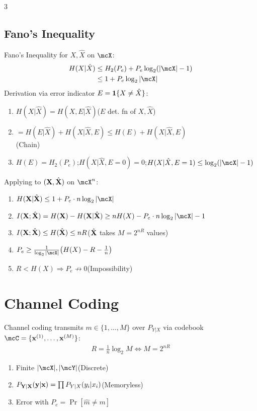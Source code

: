\documentclass[12pt, a4paper]{article}
\begin{document}
\begin{multicols*}{3}
\colbreak
\subsection{Fano's Inequality}
Fano's Inequality for $X,\hat X$ on $\mcX$:
\begin{align*}
  H(X|\hat X)&\le H_2(P_e)+P_e\log_2(|\mcX|-1)\\
             &\le 1+P_e\log_2|\mcX|
\end{align*}
Derivation via error indicator $E=\mathbf{1}{\{X\neq\hat X\}}$:
\begin{enumerate}[\roman*.]
  \item $H(X|\hat X)=H(X,E|\hat X)$\hfill($E$ det. fn of $X,\hat X$)
  \item $=H(E|\hat X)+H(X|\hat X,E)\le H(E)+H(X|\hat X,E)$\\\hfill(Chain)
  \item $H(E)=H_2(P_e)$;\;$H(X|\hat X,E=0)=0$;\;$H(X|\hat X,E=1)\le\log_2(|\mcX|-1)$
\end{enumerate}
 
Applying to $(\mathbf{X},\hat{\mathbf{X}})$ on $\mcX^n$:
\begin{enumerate}[\roman*.]
  \item $H(\bX|\hat\bX)\le 1+P_e\cdot n\log_2|\mcX|$
  \item $I(\bX;\hat\bX)=H(\bX)-H(\bX|\hat\bX)\ge nH(X)-P_e\cdot n\log_2|\mcX|-1$
  \item $I(\mathbf{X};\hat{\mathbf{X}})\le H(\hat{\mathbf{X}})\le nR$\hfill($\hat{\mathbf{X}}$ takes $M=2^{nR}$ values)
  \item $P_e\ge\tfrac{1}{\log_2|\mcX|}\big(H(X)-R-\tfrac{1}{n}\big)$
  \item $R<H(X)\Rightarrow P_e\not\to 0$\hfill(Impossibility)
\end{enumerate}
\colbreak 
\colbreak
\section{Channel Coding}
Channel coding transmits $m\in\{1,\dots,M\}$ over $P_{Y|X}$ via codebook $\mcC=\{\bx^{(1)},\dots,\bx^{(M)}\}$:
\begin{align*}
  R=\tfrac{1}{n}\log_2 M \iff M = 2^{nR}
\end{align*}
\begin{enumerate}[\roman*.]
  \item Finite $|\mcX|,|\mcY|$\hfill(Discrete)
  \item $P_{\mathbf{Y}|\mathbf{X}}(\mathbf{y}|\mathbf{x})=\prod P_{Y|X}(y_i|x_i)$\hfill(Memoryless)
  \item Error with $P_e=\Pr[\hat m\neq m]$
\end{enumerate}
 

\end{multicols*}
\end{document}
